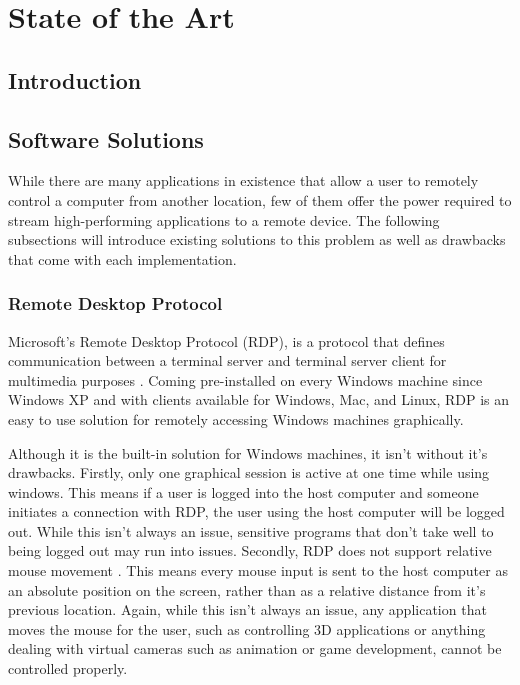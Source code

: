 \chapter{State of the Art} %

\label{Chapter3} %


\section{Introduction}\label{sec:Introduction}

\todosection

\section{Software Solutions}\label{sec:SoftwareSolutions}

While there are many applications in existence that allow a user to remotely control a computer from another location, few of them offer the power required to stream high-performing applications to a remote device.
The following subsections will introduce existing solutions to this problem as well as drawbacks that come with each implementation.


\subsection{Remote Desktop Protocol}\label{subsec:RemoteDesktopProtocol}

Microsoft's Remote Desktop Protocol (RDP), is a protocol that defines communication between a terminal server and terminal server client for multimedia purposes \cite{rdpDocs}.
Coming pre-installed on every Windows machine since Windows XP and with clients available for Windows, Mac, and Linux, RDP is an easy to use solution for remotely accessing Windows machines graphically. 

Although it is the built-in solution for Windows machines, it isn't without it's drawbacks.
Firstly, only one graphical session is active at one time while using windows.
This means if a user is logged into the host computer and someone initiates a connection with RDP, the user using the host computer will be logged out.
While this isn't always an issue, sensitive programs that don't take well to being logged out may run into issues.
Secondly, RDP does not support relative mouse movement \cite{burgin_2013}.
This means every mouse input is sent to the host computer as an absolute position on the screen, rather than as a relative distance from it's previous location.
Again, while this isn't always an issue, any application that moves the mouse for the user, such as controlling 3D applications or anything dealing with virtual cameras such as animation or game development, cannot be controlled properly.


